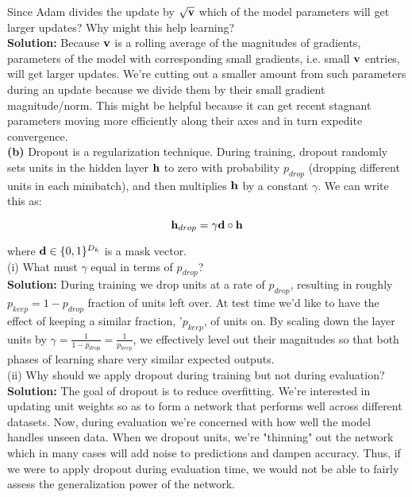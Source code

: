 \documentclass[10pt]{article}
\begin{document}
Since Adam divides the update by \(\sqrt{\bold{v}}\) which of the model parameters will get larger updates? Why might this help 
learning?\\

\textbf{Solution:} Because \(\bold{v}\) is a rolling average of the magnitudes of gradients, parameters of the model 
with corresponding small gradients, i.e. small \(\bold{v}\) entries, will get larger updates. We're cutting out
a smaller amount from such parameters during an update because we divide them by their small gradient 
magnitude/norm. 
This might be helpful because it can get recent stagnant parameters moving more efficiently along their axes 
and in turn expedite convergence.\\

\textbf{(b)} Dropout is a regularization technique. During training, dropout randomly sets units in the hidden layer \(\bold{h}\) to
 zero with probability \(p_{drop}\) (dropping different units in each minibatch), and then multiplies \(\bold{h}\) by a constant
 \(\gamma\). We can write this as:

\[\bold{h}_{drop} = \gamma \bold{d} \circ \bold{h}\]

where \(\bold{d} \in \{0, 1\}^{D_k}\) is a mask vector.\\

(i) What must \(\gamma\) equal in terms of \(p_{drop}\)?\\

\textbf{Solution:}
During training we drop units at a rate of \(p_{drop}\), resulting in roughly \(p_{keep} = 1 - p_{drop}\) fraction of
units left over. At test time we'd like to have the effect of keeping a similar fraction,   '\(p_{keep}\), of 
units on. By scaling down the layer units by \(\gamma = \frac{1}{1-p_{drop}} = \frac{1}{p_{keep}}\), we effectively level out their magnitudes so that
both phases of learning share very similar expected outputs.\\

(ii) Why should we apply dropout during training but not during evaluation?\\

\textbf{Solution:}
The goal of dropout is to reduce overfitting. We're interested in updating unit weights so as to form a network that
performs well across different datasets. Now, during evaluation we're concerned with how well the model handles unseen
data. When we dropout units, we're "thinning" out the network which in many cases will add noise to predictions and 
dampen accuracy. Thus, if we were to apply dropout during evaluation time, we would not be able to fairly assess the
generalization power of the network.
\end{document}
